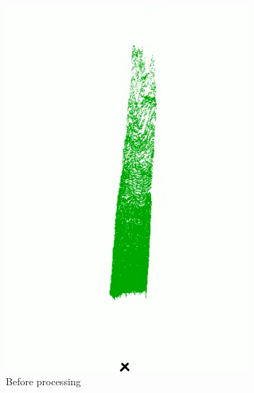 \begin{figure}[p]
    \centering
    \begin{subfigure}{.4\textwidth}
        \centering
        \includegraphics[width=\linewidth,frame]{images/occupancy_map1_nomorph.png}
        \caption{Before processing}
    \end{subfigure}
    \quad
    \begin{subfigure}{.4\textwidth}
        \centering

\end{subfigure}
\end{figure}
